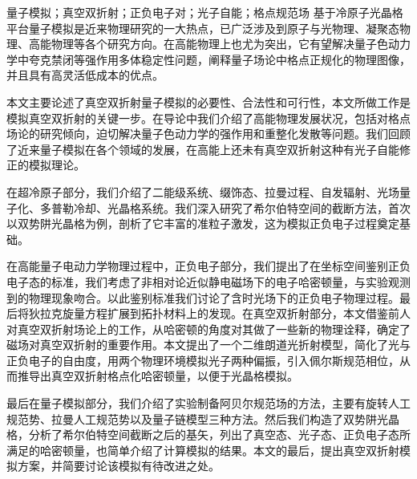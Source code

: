 \documentclass[supercite]{HustGraduPaper}
\begin{document}
	\begin{cnabstract}{量子模拟；真空双折射；正负电子对；光子自能；格点规范场}
		基于冷原子光晶格平台量子模拟是近来物理研究的一大热点，已广泛涉及到原子与光物理、凝聚态物理、高能物理等各个研究方向。在高能物理上也尤为突出，它有望解决量子色动力学中夸克禁闭等强作用多体稳定性问题，阐释量子场论中格点正规化的物理图像，并且具有高灵活低成本的优点。
		
		本文主要论述了真空双折射量子模拟的必要性、合法性和可行性，本文所做工作是模拟真空双折射的关键一步。在导论中我们介绍了高能物理发展状况，包括对格点场论的研究倾向，迫切解决量子色动力学的强作用和重整化发散等问题。我们回顾了近来量子模拟在各个领域的发展，在高能上还未有真空双折射这种有光子自能修正的模拟理论。
		
		在超冷原子部分，我们介绍了二能级系统、缀饰态、拉曼过程、自发辐射、光场量子化、多普勒冷却、光晶格系统。我们深入研究了希尔伯特空间的截断方法，首次以双势阱光晶格为例，剖析了它丰富的准粒子激发，这为模拟正负电子过程奠定基础。
		
		在高能量子电动力学物理过程中，正负电子部分，我们提出了在坐标空间鉴别正负电子态的标准，我们考虑了非相对论近似静电磁场下的电子哈密顿量，与实验观测到的物理现象吻合。以此鉴别标准我们讨论了含时光场下的正负电子物理过程。最后将狄拉克旋量方程扩展到拓扑材料上的发现。在真空双折射部分，本文借鉴前人对真空双折射场论上的工作，从哈密顿的角度对其做了一些新的物理诠释，确定了磁场对真空双折射的重要作用。本文提出了一个二维朗道光折射模型，简化了光与正负电子的自由度，用两个物理环境模拟光子两种偏振，引入佩尔斯规范相位，从而推导出真空双折射格点化哈密顿量，以便于光晶格模拟。
		
		最后在量子模拟部分，我们介绍了实验制备阿贝尔规范场的方法，主要有旋转人工规范势、拉曼人工规范势以及量子链模型三种方法。然后我们构造了双势阱光晶格，分析了希尔伯特空间截断之后的基矢，列出了真空态、光子态、正负电子态所满足的哈密顿量，也简单介绍了计算模拟的结果。本文的最后，提出真空双折射模拟方案，并简要讨论该模拟有待改进之处。
	\end{cnabstract}
\end{document}
